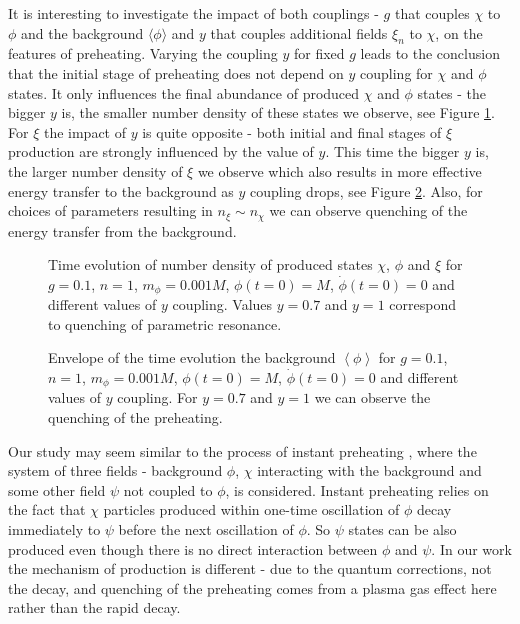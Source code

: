 \documentclass[twocolumn,showpacs,preprintnumbers,amsmath,amssymb,nofootinbib,superscriptaddress,prc]{revtex4}
\begin{document}
It is interesting to investigate the impact of both couplings - $g$ that couples $\chi$ to $\phi$ and the background $\langle \phi \rangle$ and $y$ that couples additional fields $\xi_n$ to $\chi$, on the features of preheating. Varying the coupling $y$ for fixed $g$ leads to the conclusion that the initial stage of preheating does not depend on $y$ coupling for $\chi$ and $\phi$ states. It only influences the final abundance of produced $\chi$ and $\phi$ states - the bigger $y$ is, the smaller number density of these states we observe, see Figure \ref{fig:param-dens}. For $\xi$ the impact of $y$ is quite opposite - both initial and final stages of $\xi$ production are strongly influenced by the value of $y$. This time the bigger $y$ is, the larger number density of $\xi$ we observe which also results in more effective energy transfer to the background as $y$ coupling drops, see Figure \ref{fig:param-back}. Also, for choices of parameters resulting in $n_{\xi} \sim n_{\chi}$ we can observe quenching of the energy transfer from the background.

\begin{figure}[h!]
 \begin{center}
  \caption{Time evolution of number density of produced states $\chi$, $\phi$ and $\xi$ for $g=0.1$, $n=1$, $m_\phi=0.001 M$, $\phi(t=0)=M$, $\dot{\phi}(t=0)=0$ and different values of $y$ coupling. Values $y=0.7$ and $y=1$ correspond to quenching of parametric resonance.}
   \label{fig:param-dens}
    \end{center}
\end{figure}

\begin{figure}[h!]
 \begin{center}
  \caption{Envelope of the time evolution the background $\left<\phi\right>$ for $g=0.1$, $n=1$, $m_\phi=0.001 M$, $\phi(t=0)=M$, $\dot{\phi}(t=0)=0$ and different values of $y$ coupling. For $ y=0.7$ and $y=1$ we can observe the quenching of the preheating.}
   \label{fig:param-back}
    \end{center}
\end{figure}

Our study may seem similar to the process of instant preheating \citep{Felder:1998vq, Tsujikawa:2000ik}, where the system of three fields - background $\phi$, $\chi$ interacting with the background and some other field $\psi$ not coupled to $\phi$, is considered. Instant preheating relies on the fact that $\chi$ particles produced within one-time oscillation of $\phi$ decay immediately to $\psi$ before the next oscillation of $\phi$. So $\psi$ states can be also produced even though there is no direct interaction between $\phi$ and $\psi$. In our work the mechanism of production is different - due to the quantum corrections, not the decay, and quenching of the preheating comes from a plasma gas effect here rather than the rapid decay.
\end{document}
